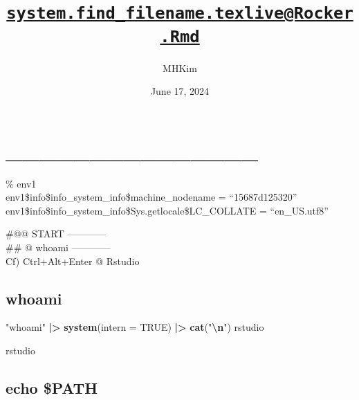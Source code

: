 \documentclass[
]{article}
\title{\href{mailto:system.find_filename.texlive@Rocker.Rmd}{\nolinkurl{system.find\_filename.texlive@Rocker.Rmd}}}
\author{MHKim}
\date{June 17, 2024}
\newenvironment{Shaded}{\begin{snugshade}}{\end{snugshade}}
\newcommand{\AttributeTok}[1]{\textcolor[rgb]{0.13,0.29,0.53}{#1}}
\newcommand{\ConstantTok}[1]{\textcolor[rgb]{0.56,0.35,0.01}{#1}}
\newcommand{\ErrorTok}[1]{\textcolor[rgb]{0.64,0.00,0.00}{\textbf{#1}}}
\newcommand{\FunctionTok}[1]{\textcolor[rgb]{0.13,0.29,0.53}{\textbf{#1}}}
\newcommand{\NormalTok}[1]{#1}
\newcommand{\SpecialCharTok}[1]{\textcolor[rgb]{0.81,0.36,0.00}{\textbf{#1}}}
\newcommand{\StringTok}[1]{\textcolor[rgb]{0.31,0.60,0.02}{#1}}
\begin{document}
\maketitle

{
\setcounter{tocdepth}{6}
\tableofcontents
}
\hypertarget{section}{%
\section{\_\_\_\_\_\_\_\_\_\_\_\_\_\_\_}\label{section}}

\% env1\\

env1\$info\$info\_system\_info\$machine\_nodename = ``15687d125320''
env1\$info\$info\_system\_info\$Sys.getlocale\$LC\_COLLATE =
``en\_US.utf8''

\#@@ START ------------\\
\#\# @ whoami ------------\\
Cf) Ctrl+Alt+Enter @ Rstudio

\hypertarget{whoami}{%
\subsection{whoami}\label{whoami}}

\begin{Shaded}
\begin{Highlighting}[]
\StringTok{"whoami"} \SpecialCharTok{|\textgreater{}}
    \FunctionTok{system}\NormalTok{(}\AttributeTok{intern =} \ConstantTok{TRUE}\NormalTok{) }\SpecialCharTok{|\textgreater{}}
    \FunctionTok{cat}\NormalTok{(}\StringTok{"}\SpecialCharTok{\textbackslash{}n}\StringTok{"}\NormalTok{)}
\NormalTok{rstudio }
\end{Highlighting}
\end{Shaded}

rstudio

\hypertarget{echo-path}{%
\subsection{echo \$PATH}\label{echo-path}}

\begin{Shaded}
\end{Shaded}
\end{document}

